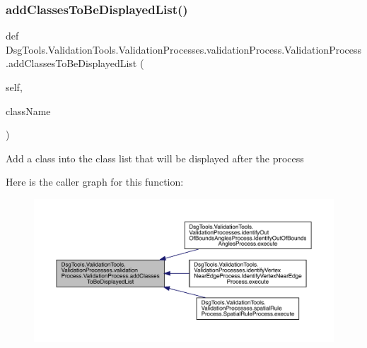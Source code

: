 \subsubsection{\texorpdfstring{add\+Classes\+To\+Be\+Displayed\+List()}{addClassesToBeDisplayedList()}}
{\footnotesize\ttfamily def Dsg\+Tools.\+Validation\+Tools.\+Validation\+Processes.\+validation\+Process.\+Validation\+Process.\+add\+Classes\+To\+Be\+Displayed\+List (\begin{DoxyParamCaption}\item[{}]{self,  }\item[{}]{class\+Name }\end{DoxyParamCaption})}

\begin{DoxyVerb}Add a class into the class list that will be displayed after the process
\end{DoxyVerb}
 Here is the caller graph for this function\+:
\nopagebreak
\begin{figure}[H]
\begin{center}
\leavevmode
\includegraphics[width=350pt]{class_dsg_tools_1_1_validation_tools_1_1_validation_processes_1_1validation_process_1_1_validation_process_a8fea1371f192ee3c0489f17e957d511b_icgraph}
\end{center}
\end{figure}
\mbox{\label{class_dsg_tools_1_1_validation_tools_1_1_validation_processes_1_1validation_process_1_1_validation_process_a57cad7b940bc478076d12aca952d0a8c}} 
